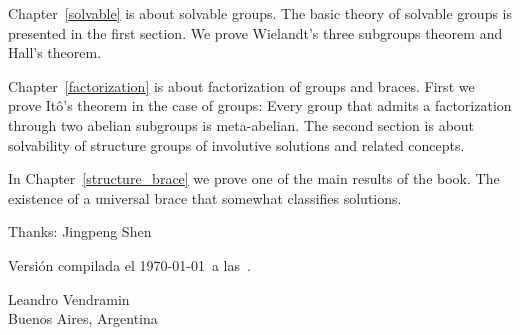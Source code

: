 Chapter~\ref{solvable} is about solvable groups. The basic theory of solvable groups is presented in the first section. We
prove Wielandt's three subgroups theorem and Hall's theorem. 

Chapter~\ref{factorization} is about factorization of groups and braces. First
we prove It\^o's theorem in the case of groups: Every group that admits a factorization through two 
abelian subgroups is meta-abelian. The second section is about solvability of structure groups
of involutive solutions and related concepts. 

In Chapter~\ref{structure_brace} we prove one of the main results of the book. The existence of a universal brace
that somewhat classifies solutions. 




Thanks: Jingpeng Shen

\medskip
Versión compilada el \today~a las~\currenttime.

\begin{flushright}
Leandro Vendramin\\Buenos Aires, Argentina\par
\end{flushright}
